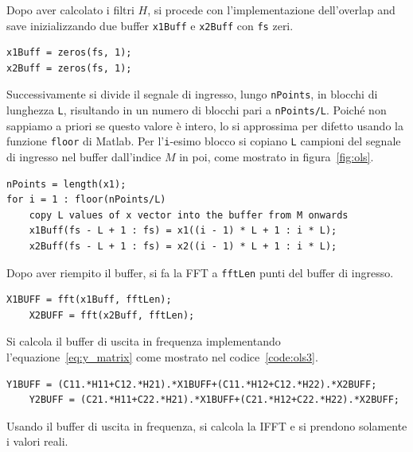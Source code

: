 \documentclass[12pt,a4paper,titlepage]{article}
\begin{document}
Dopo aver calcolato i filtri $H$, si procede con l'implementazione dell'overlap and save inizializzando due buffer \texttt{x1Buff} e \texttt{x2Buff} con \texttt{fs} zeri.

\begin{lstlisting}[label=code:buffer_ols, caption=Inizializzazione dei buffer per l'overlap and save, captionpos=b]
x1Buff = zeros(fs, 1);
x2Buff = zeros(fs, 1);
\end{lstlisting}

Successivamente si divide il segnale di ingresso, lungo \texttt{nPoints}, in blocchi di lunghezza \texttt{L}, risultando in un numero di blocchi pari a \texttt{nPoints/L}. Poiché non sappiamo a priori se questo valore è intero, lo si approssima per difetto usando la funzione \texttt{floor} di Matlab. Per l'\texttt{i}-esimo blocco si copiano \texttt{L} campioni del segnale di ingresso nel buffer dall'indice $M$ in poi, come mostrato in figura~\ref{fig:ols}.

\begin{lstlisting}[label=code:ols1, caption=Copia di L campioni del segnale di ingresso nel buffer, captionpos=b]
nPoints = length(x1);
for i = 1 : floor(nPoints/L)
    copy L values of x vector into the buffer from M onwards
    x1Buff(fs - L + 1 : fs) = x1((i - 1) * L + 1 : i * L); 
    x2Buff(fs - L + 1 : fs) = x2((i - 1) * L + 1 : i * L); 
\end{lstlisting}

Dopo aver riempito il buffer, si fa la FFT a \texttt{fftLen} punti del buffer di ingresso.

\begin{lstlisting}[label=code:ols2, caption=FFT del buffer di ingresso, captionpos=b]
	X1BUFF = fft(x1Buff, fftLen);
	X2BUFF = fft(x2Buff, fftLen);
\end{lstlisting}

Si calcola il buffer di uscita in frequenza implementando l'equazione~\eqref{eq:y_matrix} come mostrato nel codice~\ref{code:ols3}.

\begin{lstlisting}[label=code:ols3, caption=Calcolo del buffer di uscita in frequenza, captionpos=b]
	Y1BUFF = (C11.*H11+C12.*H21).*X1BUFF+(C11.*H12+C12.*H22).*X2BUFF;
	Y2BUFF = (C21.*H11+C22.*H21).*X1BUFF+(C21.*H12+C22.*H22).*X2BUFF;
\end{lstlisting}
    
Usando il buffer di uscita in frequenza, si calcola la IFFT e si prendono solamente i valori reali.
\end{document}
